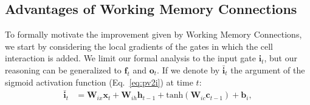 
\subsection{Advantages of Working Memory Connections}
\label{subsec:ph}
To formally motivate the improvement given by Working Memory Connections, we start by considering the local gradients of the gates in which the cell interaction is added. We limit our formal analysis to the input gate $\mathbf{i}_t$, but our reasoning can be generalized to $\mathbf{f}_t$ and $\mathbf{o}_t$.
%
If we denote by $\mathbf{\bar i}_t$ the argument of the sigmoid activation function (Eq.~\ref{eq:pv2i}) at time $t$:
\begin{align}
        \mathbf{\bar i}_t &= \mathbf{W}_{ix}\mathbf{x}_{t} +
                                     \mathbf{W}_{ih} \mathbf{h}_{t-1} +
                                     \text{tanh}(\mathbf{W}_{ic} \mathbf{c}_{t-1}) +
                                     \mathbf{b}_i ,
\end{align}

